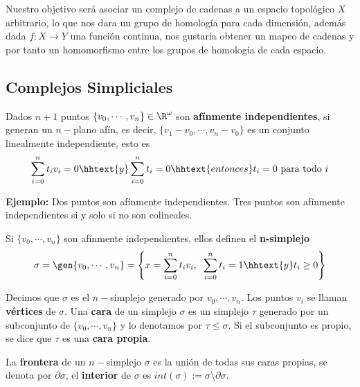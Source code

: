 \documentclass{article}
\begin{document}
\vspace{2mm}
\noindent Nuestro objetivo será asociar un complejo de cadenas a un espacio topológico $X$ 
arbitrario, lo que nos dara un grupo de homología para cada dimensión, además dada $f:X\to Y$ una
función continua, nos gustaría obtener un mapeo de cadenas y por tanto un homomorfismo entre los
grupos de homología de cada espacio.

\newpage
\subsection{Complejos Simpliciales}
\begin{dfn}
    Dados $n+1$ puntos $\{v_{0},\cdots,v_{n}\}\in\R^{\omega}$ son \textbf{afínmente 
    independientes}, si generan un $n-$plano afín, es decir, $\{v_{1}-v_{0},\cdots,v_{n}-v_{0}\}$
    es un conjunto linealmente independiente, esto es
    \begin{equation*}
        \sum_{i=0}^{n}t_{i}v_{i}=0\hhtext{y}\sum_{i=0}^{n}t_{i}=0
        \hhtext{entonces}t_{i}=0\text{ para todo }i
    \end{equation*}
\end{dfn}

\vspace{2mm}
\noindent\textbf{Ejemplo:} Dos puntos son afínmente independientes. Tres puntos son afínmente 
independientes si y solo si no son colineales.

\vspace{2mm}
\begin{dfn}
    Si $\{v_{0},\cdots,v_{n}\}$ son afínmente independientes, ellos definen el \textbf{n-simplejo}
    \begin{equation*}
        \sigma=\gen{v_{0},\cdots,v_{n}}=\left\{x=\sum_{i=0}^{n}t_{i}v_{i},\hspace{2mm}
        \sum_{i=0}^{n}t_{i}=1\hhtext{y}t_{i}\geq0\right\}
    \end{equation*}
\end{dfn}

\noindent Decimos que $\sigma$ es el $n-$simplejo generado por $v_{0},\cdots,v_{n}$. Los puntos 
$v_{i}$ se llaman \textbf{vértices} de $\sigma$. Una \textbf{cara} de un simplejo $\sigma$ es 
un simplejo $\tau$ generado por un subconjunto de $\{v_{0},\cdots,v_{n}\}$ y lo denotamos por 
$\tau\leq\sigma$. Si el subconjunto es propio, se dice que $\tau$ es una \textbf{cara propia}.

\vspace{2mm}
\noindent La \textbf{frontera} de un $n-$simplejo $\sigma$ es la unión de todas sus caras propias, 
se denota por $\partial\sigma$, el \textbf{interior} de $\sigma$ es $int(\sigma):=
\sigma\setminus\partial\sigma$.
\end{document}
